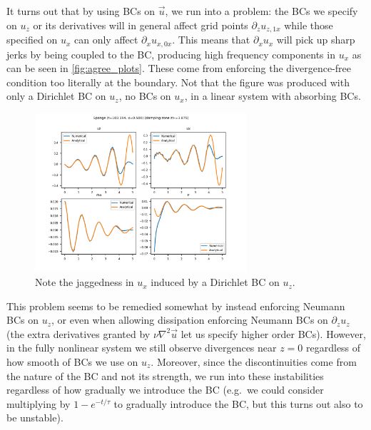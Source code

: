 \documentclass[11pt,
        usenames, %
        dvipsnames %
    ]{report}
\begin{document}
It turns out that by using BCs on $\vec{u}$, we run into a problem: the BCs we
specify on $u_z$ or its derivatives will in general affect grid points
$\partial_z u_{z, 1x}$ while those specified on $u_x$ can only affect
$\partial_x u_{x, 0x}$. This means that $\partial_x u_x$ will pick up
sharp jerks by being coupled to the BC, producing high frequency components in
$u_x$ as can be seen in \autoref{fig:agree_plots}. These come from enforcing the
divergence-free condition too literally at the boundary. Not that the figure was
produced with only a Dirichlet BC on $u_z$, no BCs on $u_x$, in a linear system
with absorbing BCs.
\begin{figure}[!h]
    \centering
    \includegraphics[width=0.7\textwidth]{../sims_old/2d_1_strat/agree_plots/sponge_2.png}
    \caption{Note the jaggedness in $u_x$ induced by a Dirichlet BC on
    $u_z$.}\label{fig:agree_plots}
\end{figure}

This problem seems to be remedied somewhat by instead enforcing Neumann BCs on
$u_z$, or even when allowing dissipation enforcing Neumann BCs on $\partial_z
u_z$ (the extra derivatives granted by $\nu \nabla^2 \vec{u}$ let us specify
higher order BCs). However, in the fully nonlinear system we still observe
divergences near $z=0$ regardless of how smooth of BCs we use on $u_z$.
Moreover, since the discontinuities come from the nature of the BC and not its
strength, we run into these instabilities regardless of how gradually we
introduce the BC (e.g.\ we could consider multiplying by $1 - e^{-t/\tau}$ to
gradually introduce the BC, but this turns out also to be unstable).
\end{document}
